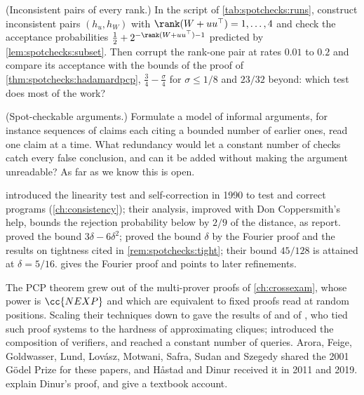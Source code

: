 \begin{refsection}
\begin{exercises}
\item \simulation (Inconsistent pairs of every rank.) In the script of \cref{tab:spotchecks:runs}, construct inconsistent pairs $(h_u,h_W)$ with $\rank(W+uu^\top)=1,\dots,4$ and check the acceptance probabilities $\frac12+2^{-\rank(W+uu^\top)-1}$ predicted by \cref{lem:spotchecks:subset}. Then corrupt the rank-one pair at rates $0.01$ to $0.2$ and compare its acceptance with the bounds of the proof of \cref{thm:spotchecks:hadamardpcp}, $\frac34-\frac\sigma4$ for $\sigma\le1/8$ and $23/32$ beyond: which test does most of the work?\label{ex:spotchecks:ranks}

\item \research (Spot-checkable arguments.) Formulate a model of informal arguments, for instance sequences of claims each citing a bounded number of earlier ones, read one claim at a time. What redundancy would let a constant number of checks catch every false conclusion, and can it be added without making the argument unreadable? As far as we know this is open.\label{ex:spotchecks:informal}
\end{exercises}

\notesandrefs
\Textcite{BlumLubyRubinfeld1993} introduced the linearity test and self-correction in 1990 to test and correct programs (\cref{ch:consistency}); their analysis, improved with Don Coppersmith's help, bounds the rejection probability below by $2/9$ of the distance, as \textcite{BellareEtAl1996} report. \Textcite{BellareEtAl1993} proved the bound $3\delta-6\delta^2$; \textcite{BellareEtAl1996} proved the bound $\delta$ by the Fourier proof and the results on tightness cited in \cref{rem:spotchecks:tight}; their bound $45/128$ is attained at $\delta=5/16$. \Textcite[Chapter~1]{ODonnell2014} gives the Fourier proof and points to later refinements.

The PCP theorem grew out of the multi-prover proofs of \cref{ch:crossexam}, whose power is $\cc{NEXP}$ and which are equivalent to fixed proofs read at random positions. Scaling their techniques down to  gave the results of \textcite{BabaiEtAl1991} and of \textcite{FeigeEtAl1996}, who tied such proof systems to the hardness of approximating cliques; \textcite{AroraSafra1998} introduced the composition of verifiers, and \textcite{AroraEtAl1998} reached a constant number of queries. Arora, Feige, Goldwasser, Lund, Lovász, Motwani, Safra, Sudan and Szegedy shared the 2001 Gödel Prize for these papers, and Håstad and Dinur received it in 2011 and 2019. \Textcite{RadhakrishnanSudan2007} explain Dinur's proof, and \textcite[Chapters~11 and~22]{AroraBarak2009} give a textbook account.


\end{refsection}
